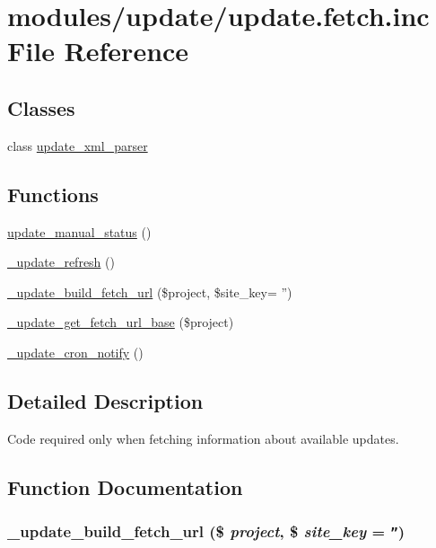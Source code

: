 \hypertarget{update_8fetch_8inc}{
\section{modules/update/update.fetch.inc File Reference}
\label{update_8fetch_8inc}
}
\subsection*{Classes}
\begin{CompactItemize}
\item 
class \hyperlink{classupdate__xml__parser}{update\_\-xml\_\-parser}
\end{CompactItemize}
\subsection*{Functions}
\begin{CompactItemize}
\item 
\hyperlink{update_8fetch_8inc_cb92114e3c9f719e50f66ac62ff78e01}{update\_\-manual\_\-status} ()
\item 
\hyperlink{update_8fetch_8inc_a9814236d331f2e6822435215e9acd8e}{\_\-update\_\-refresh} ()
\item 
\hyperlink{update_8fetch_8inc_6d937d41a6ccf645109deefae0f6e5d3}{\_\-update\_\-build\_\-fetch\_\-url} (\$project, \$site\_\-key= '')
\item 
\hyperlink{update_8fetch_8inc_53552af8849428ac6faba273936eb00a}{\_\-update\_\-get\_\-fetch\_\-url\_\-base} (\$project)
\item 
\hyperlink{update_8fetch_8inc_55d78e25faf69f49cfc88f2642c06f4e}{\_\-update\_\-cron\_\-notify} ()
\end{CompactItemize}


\subsection{Detailed Description}
Code required only when fetching information about available updates. 

\subsection{Function Documentation}
\hypertarget{update_8fetch_8inc_6d937d41a6ccf645109deefae0f6e5d3}{
\subsubsection[{\_\-update\_\-build\_\-fetch\_\-url}]{\setlength{\rightskip}{0pt plus 5cm}\_\-update\_\-build\_\-fetch\_\-url (\$ {\em project}, \/  \$ {\em site\_\-key} = {\tt ''})}}
\label{update_8fetch_8inc_6d937d41a6ccf645109deefae0f6e5d3}


